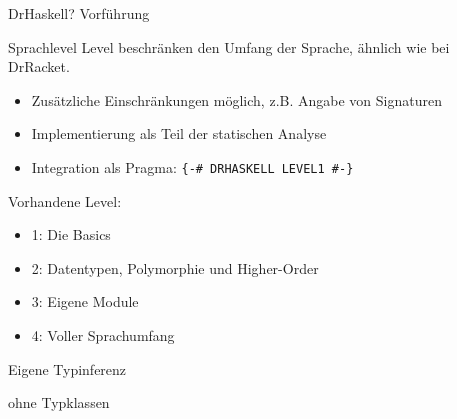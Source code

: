\begin{frame}{DrHaskell?}
	\centering \huge Vorführung
\end{frame}
\begin{frame}{Sprachlevel}
	Level beschränken den Umfang der Sprache, ähnlich wie bei DrRacket.
	\begin{itemize}
		\item Zusätzliche Einschränkungen  möglich, z.B. Angabe von Signaturen
		\item Implementierung als Teil der statischen Analyse
		\item Integration als Pragma: \texttt{\{-\# DRHASKELL LEVEL1 \#-\}}
	\end{itemize}
	Vorhandene Level: \par
	\begin{minipage}[T]{.55 \textwidth}
		\begin{itemize}
			\item 1: Die Basics
			\item 2: Datentypen, Polymorphie und Higher-Order
			\item 3: Eigene Module
			\item 4: Voller Sprachumfang
		\end{itemize}
	\end{minipage}
	\begin{minipage}[T]{.4 \textwidth}
			\scalebox{6}{\}} Eigene Typinferenz \par \hspace{32px} ohne Typklassen
	\end{minipage}
\end{frame}